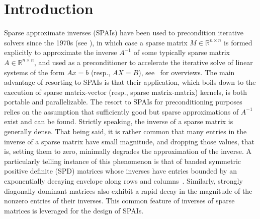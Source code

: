 \documentclass[numbers,webpdf,imanum]{ima-authoring-template}%
\theoremstyle{thmstyletwo}%
\numberwithin{equation}{section}
\begin{document}
\section{Introduction}\label{sec:intro}
Sparse approximate inverses (SPAIs) have been used to precondition iterative solvers since the 1970s (see \cite{benson1973,frederickson1975fast}), in which case a sparse matrix $M\in\mathbb{R}^{n\times n}$ is formed explicitly to approximate the inverse $A^{-1}$ of some typically sparse matrix $A\in\mathbb{R}^{n\times n}$, and used as a preconditioner to accelerate the iterative solve of linear systems of the form $Ax=b$ (resp., $AX=B$), see~\cite{benzi1999comparative,benzi2002preconditioning} for overviews.
The main advantage of resorting to SPAIs is that their application, which boils down to the execution of sparse matrix-vector (resp., sparse matrix-matrix) kernels, is both portable and parallelizable.
The resort to SPAIs for preconditioning purposes relies on the assumption that sufficiently good but sparse approximations of $A^{-1}$ exist and can be found.
Strictly speaking, the inverse of a sparse matrix is generally dense.
That being said, it is rather common that many entries in the inverse of a sparse matrix have small magnitude, and dropping those values, that is, setting them to zero, minimally degrades the approximation of the inverse.
A particularly telling instance of this phenomenon is that of banded symmetric positive definite (SPD) matrices whose inverses have entries bounded by an exponentially decaying envelope along rows and columns~\cite{demko1984decay}.
Similarly, strongly diagonally dominant matrices also exhibit a rapid decay in the magnitude of the nonzero entries of their inverses.
This common feature of inverses of sparse matrices is leveraged for the design of SPAIs.
\end{document}
